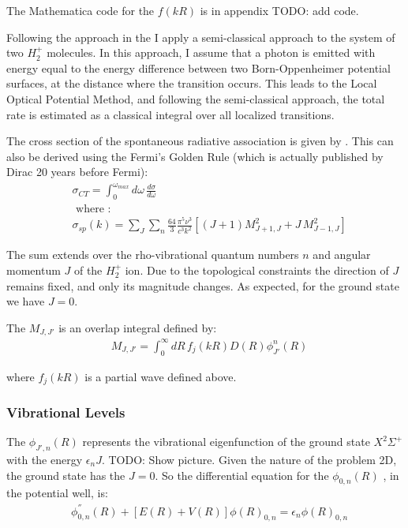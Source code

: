 The Mathematica code for the $  f(kR) $ is in appendix TODO: add code.

Following the approach in the \cite{ZL} I apply a semi-classical approach to the system of two $ H_2^{+} $ molecules. In this approach, I assume that a photon is emitted with energy equal to the energy difference between two Born-Oppenheimer potential surfaces, at the distance where the transition occurs. This leads to the Local Optical Potential Method, and following the semi-classical approach, the total rate is estimated as a classical integral over all localized transitions. 

The cross section of the spontaneous radiative association is given by \cite{Zygelman1} .  This can also be derived using the Fermi's Golden Rule (which is actually published by Dirac 20 years before Fermi)\cite{FermiGR}:
\begin{equation}
\begin{split}
& \sigma_{CT}  = \int_0^{\omega_{max}}{d\omega\,\frac{d\sigma}{d\omega}} \\[.8em]
& \text{ where }: \\[.8em]
& \sigma_{sp}(k) = \sum_J\sum_n{\frac{64}{3}\frac{\pi^5\nu^3}{c^3k^2}\left[(J+1)M_{J+1,J}^2 + J\,M_{J-1,J}^2 \right] }
\end{split}
\end{equation}

The sum extends over the rho-vibrational quantum numbers $ n $ and angular momentum $ J $ of the $ H_2^{+} $ ion. Due to the topological constraints the direction of $ J $ remains fixed, and only its magnitude changes. As expected, for the ground state we have $ J = 0 $. 

The $ M_{J,J'}  $ is an overlap integral defined by:
\begin{equation}
\begin{split}
& M_{J,J'} = \int_0^{\infty}{dR\,f_j(kR)D(R)\phi_{J'}^n(R)}
\end{split}
\end{equation}

where $ f_j(kR) $ is a partial wave defined above. 

\subsubsection{Vibrational Levels}

The $ \phi_{J',n}(R) $ represents the vibrational eigenfunction of the ground state   $ X^2\Sigma^{+} $ with the energy $ \epsilon_nJ $. TODO: Show picture.   Given the nature of the problem 2D, the ground state has the $ J = 0 $. So the differential equation for the  $ \phi_{0,n}(R) $ , in the potential well, is:
\begin{equation}
\begin{split}
& \phi_{0,n}^{''}(R) + \left[ E(R) + V(R)  \right]\phi(R)_{0,n} = \epsilon_n \phi(R)_{0,n}
\end{split}
\end{equation}

